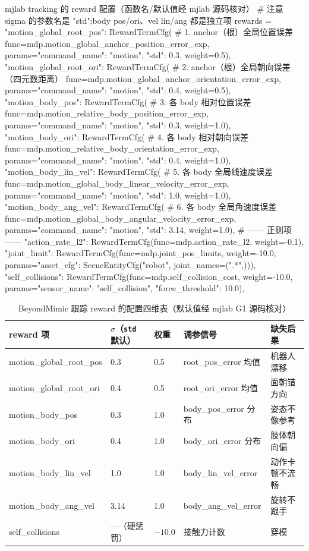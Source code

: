 \begin{codebox}[Python]{mjlab tracking 的 reward 配置（函数名/默认值经 mjlab 源码核对）}
# 注意 sigma 的参数名是 "std";body pos/ori、vel lin/ang 都是独立项
rewards = {
    "motion_global_root_pos":  RewardTermCfg(   # 1. anchor（根）全局位置误差
        func=mdp.motion_global_anchor_position_error_exp,
        params={"command_name": "motion", "std": 0.3}, weight=0.5),
    "motion_global_root_ori":  RewardTermCfg(   # 2. anchor（根）全局朝向误差（四元数距离）
        func=mdp.motion_global_anchor_orientation_error_exp,
        params={"command_name": "motion", "std": 0.4}, weight=0.5),
    "motion_body_pos":         RewardTermCfg(   # 3. 各 body 相对位置误差
        func=mdp.motion_relative_body_position_error_exp,
        params={"command_name": "motion", "std": 0.3}, weight=1.0),
    "motion_body_ori":         RewardTermCfg(   # 4. 各 body 相对朝向误差
        func=mdp.motion_relative_body_orientation_error_exp,
        params={"command_name": "motion", "std": 0.4}, weight=1.0),
    "motion_body_lin_vel":     RewardTermCfg(   # 5. 各 body 全局线速度误差
        func=mdp.motion_global_body_linear_velocity_error_exp,
        params={"command_name": "motion", "std": 1.0}, weight=1.0),
    "motion_body_ang_vel":     RewardTermCfg(   # 6. 各 body 全局角速度误差
        func=mdp.motion_global_body_angular_velocity_error_exp,
        params={"command_name": "motion", "std": 3.14}, weight=1.0),
    # —— 正则项 ——
    "action_rate_l2": RewardTermCfg(func=mdp.action_rate_l2, weight=-0.1),
    "joint_limit":    RewardTermCfg(func=mdp.joint_pos_limits, weight=-10.0,
        params={"asset_cfg": SceneEntityCfg("robot", joint_names=(".*",))}),
    "self_collisions": RewardTermCfg(func=mdp.self_collision_cost, weight=-10.0,
        params={"sensor_name": "self_collision", "force_threshold": 10.0}),
}
\end{codebox}

\begin{table}[ht]
\centering
\small
\caption{BeyondMimic 跟踪 reward 的配置四维表（默认值经 mjlab G1 源码核对）}
\label{tab:rlmc-imit-rewardterms}
\begin{tabular}{@{}lllll@{}}
\toprule
reward 项 & $\sigma$（\texttt{std} 默认） & 权重 & 调参信号 & 缺失后果 \\
\midrule
motion\_global\_root\_pos & 0.3 & 0.5 & root\_pos\_error 均值 & 机器人漂移 \\
motion\_global\_root\_ori & 0.4 & 0.5 & root\_ori\_error 均值 & 面朝错方向 \\
motion\_body\_pos & 0.3 & 1.0 & body\_pos\_error 分布 & 姿态不像参考 \\
motion\_body\_ori & 0.4 & 1.0 & body\_ori\_error 分布 & 肢体朝向偏 \\
motion\_body\_lin\_vel & 1.0 & 1.0 & body\_lin\_vel\_error & 动作卡顿不流畅 \\
motion\_body\_ang\_vel & 3.14 & 1.0 & body\_ang\_vel\_error & 旋转不跟手 \\
self\_collisions & ---（硬惩罚） & $-10.0$ & 接触力计数 & 穿模 \\
\bottomrule
\end{tabular}
\end{table}

